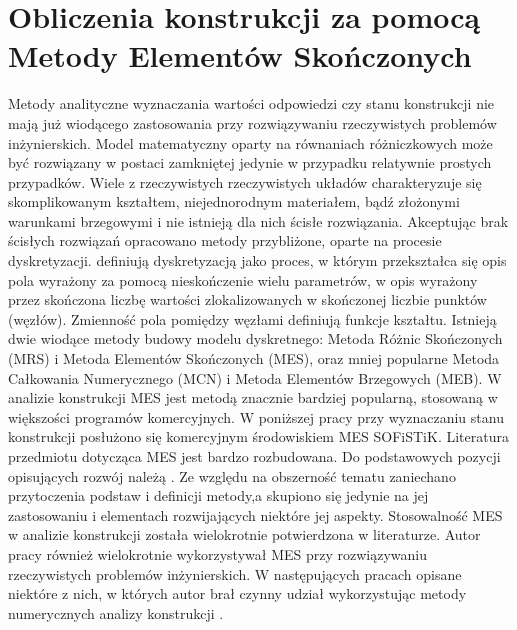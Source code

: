 \section{Obliczenia konstrukcji za pomocą Metody Elementów Skończonych}
Metody analityczne wyznaczania wartości odpowiedzi czy stanu konstrukcji nie mają już wiodącego zastosowania przy rozwiązywaniu rzeczywistych problemów inżynierskich. Model matematyczny oparty na równaniach różniczkowych może być rozwiązany w postaci zamkniętej jedynie w przypadku relatywnie prostych przypadków. Wiele z rzeczywistych rzeczywistych układów charakteryzuje się skomplikowanym kształtem, niejednorodnym materiałem, bądź złożonymi warunkami brzegowymi i nie istnieją dla nich ścisłe rozwiązania. Akceptując brak ścisłych rozwiązań opracowano metody przybliżone, oparte na procesie dyskretyzacji. \cite{Rakowski2016} definiują dyskretyzacją jako proces, w którym przekształca się opis pola wyrażony za pomocą nieskończenie wielu parametrów, w opis wyrażony przez skończona liczbę wartości zlokalizowanych w skończonej liczbie punktów (węzłów). Zmienność pola pomiędzy węzłami definiują funkcje kształtu. Istnieją dwie wiodące metody budowy modelu dyskretnego: Metoda Różnic Skończonych (MRS) i Metoda Elementów Skończonych (MES), oraz mniej popularne Metoda Całkowania Numerycznego (MCN) i Metoda Elementów Brzegowych (MEB). W analizie konstrukcji MES jest metodą znacznie bardziej popularną, stosowaną w większości programów komercyjnych. W poniższej pracy przy wyznaczaniu stanu konstrukcji posłużono się komercyjnym środowiskiem MES SOFiSTiK. Literatura przedmiotu dotycząca MES jest bardzo rozbudowana. Do podstawowych pozycji opisujących rozwój należą \parencite{Kleiber1985,Hughes1987,Zienkiewicz2005,Rakowski2016}. Ze względu na obszerność tematu zaniechano przytoczenia podstaw i definicji metody,a skupiono się jedynie na jej zastosowaniu i elementach rozwijających niektóre jej aspekty. Stosowalność MES w analizie konstrukcji została wielokrotnie potwierdzona w literaturze. Autor pracy również wielokrotnie wykorzystywał MES przy rozwiązywaniu rzeczywistych problemów inżynierskich. W następujących pracach opisane niektóre z nich, w których autor brał czynny udział wykorzystując metody numerycznych analizy konstrukcji \parencite{Zotowski2016d,Zotowski2017a,Cudny2017,Zotowski2017h,Zotowski2018a,Zoto wski2018d,Zotowski2018c,Binczyk2020a}.

